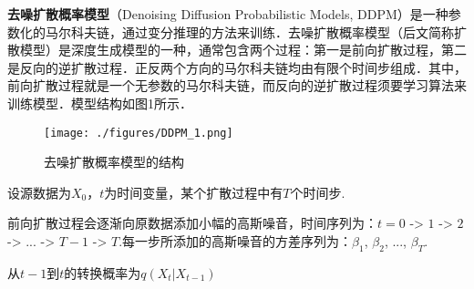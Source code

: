
\textbf{去噪扩散概率模型}（Denoising Diffusion Probabilistic Models, DDPM）是一种参数化的马尔科夫链，通过变分推理的方法来训练．去噪扩散概率模型（后文简称扩散模型）是深度生成模型的一种，通常包含两个过程：第一是前向扩散过程，第二是反向的逆扩散过程．正反两个方向的马尔科夫链均由有限个时间步组成．其中，前向扩散过程就是一个无参数的马尔科夫链，而反向的逆扩散过程须要学习算法来训练模型．模型结构如图1所示．
\begin{figure}[ht]
\centering
\texttt{[image: ./figures/DDPM\_1.png]}
\caption{去噪扩散概率模型的结构} \label{DDPM_fig1}
\end{figure}

设源数据为$X_0$，$t$为时间变量，某个扩散过程中有$T$个时间步.

前向扩散过程会逐渐向原数据添加小幅的高斯噪音，时间序列为：$t=0$ -> $1$ -> $2$ -> ... -> $T-1$ -> $T$.每一步所添加的高斯噪音的方差序列为：$\beta_1$, $\beta_2$, ..., $\beta_T$.

从$t-1$到$t$的转换概率为$q(X_t|X_{t-1})$


